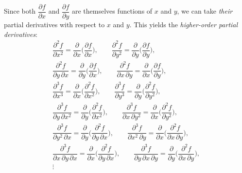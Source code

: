 Since both $\dfrac{\partial f}{\partial x}$ and $\dfrac{\partial f}{\partial y}$ are themselves functions of $x$ and
$y$, we can take \emph{their} partial derivatives with respect to $x$ and $y$. 
This yields the \emph{higher-order partial derivatives}:
\begin{gather*}
 \dfrac{\partial^2 f}{\partial x^2} = \dfrac{\partial}{\partial x} \biggl( \dfrac{\partial f}{\partial x} \biggr),
 \qquad
 \dfrac{\partial^2 f}{\partial y^2} =\dfrac{\partial}{\partial y} \biggl( \dfrac{\partial f}{\partial y} \biggr),
 \\
 \dfrac{\partial^2 f}{\partial y \, \partial x} = \dfrac{\partial}{\partial y} \biggl( \dfrac{\partial f}{\partial x}
  \biggr),
  \qquad
 \dfrac{\partial^2 f}{\partial x \, \partial y} = \dfrac{\partial}{\partial x} \biggl( \dfrac{\partial f}{\partial y}
  \biggr),
  \\
 \dfrac{\partial^3 f}{\partial x^3} = \dfrac{\partial}{\partial x} \biggl( \dfrac{\partial^2 f}{\partial x^2} \biggr),
 \qquad
 \dfrac{\partial^3 f}{\partial y^3} =\dfrac{\partial}{\partial y} \biggl( \dfrac{\partial^2 f}{\partial y^2}
 \biggr),
 \\
 \dfrac{\partial^3 f}{\partial y \, \partial x^2} =
  \dfrac{\partial}{\partial y} \biggl( \dfrac{\partial^2 f}{\partial x^2} \biggr),
  \qquad
 \dfrac{\partial^3 f}{\partial x \, \partial y^2} =
  \dfrac{\partial}{\partial x} \biggl( \dfrac{\partial^2 f}{\partial y^2} \biggr),
  \\
 \dfrac{\partial^3 f}{\partial y^2 \, \partial x} =
  \dfrac{\partial}{\partial y} \biggl( \dfrac{\partial^2 f}{\partial y \, \partial x} \biggr),
  \qquad
 \dfrac{\partial^3 f}{\partial x^2 \, \partial y} =
  \dfrac{\partial}{\partial x} \biggl( \dfrac{\partial^2 f}{\partial x \, \partial y} \biggr),
  \\
 \dfrac{\partial^3 f}{\partial x \, \partial y \, \partial x} =
  \dfrac{\partial}{\partial x} \biggl( \dfrac{\partial^2 f}{\partial y \, \partial x} \biggr),
  \qquad
 \dfrac{\partial^3 f}{\partial y \, \partial x \, \partial y} =
  \dfrac{\partial}{\partial y} \biggl( \dfrac{\partial^2 f}{\partial x \, \partial y} \biggr),
  \\
 \vdots
\end{gather*}

